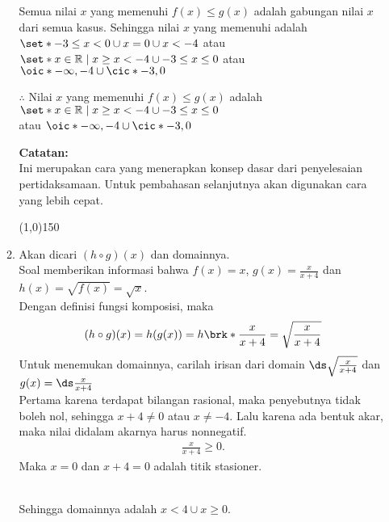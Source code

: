 \begin{enumerate}[leftmargin=*, label={\arabic*}.]
\begin{enumerate}[label={\alph*}.]
Semua nilai $x$ yang memenuhi $f(x) \leq g(x)$ adalah gabungan nilai $x$ 
dari semua kasus. Sehingga nilai $x$ yang memenuhi adalah 
$\set*{-3 \leq x < 0 \cup x = 0 \cup x < -4}$ atau 
$\set*{x \in \mathbb{R} \mid x \geq x < -4 \cup -3 \leq x \leq 0}$
atau $\oic*{-\infty, -4} \cup \cic*{-3,0}$
    
$\therefore$ Nilai $x$ yang memenuhi $f(x) \leq g(x)$ adalah
$\set*{x \in \mathbb{R} \mid x \geq x < -4 \cup -3 \leq x \leq 0}$\\
atau $\oic*{-\infty, -4} \cup \cic*{-3,0}$
    
\vspace{0.1cm}
\textbf{Catatan:}\\
Ini merupakan cara yang menerapkan konsep dasar dari penyelesaian
pertidaksamaan. Untuk pembahasan selanjutnya akan digunakan cara yang 
lebih cepat.
\begin{center}
    \line(1,0){150}
\end{center}
\item Akan dicari $(h \circ g)(x)$ dan domainnya.\\
Soal memberikan informasi bahwa $f(x) = x$, $g(x) = \frac{x}{x+4}$ 
dan $h(x) = \sqrt{f(x)} = \sqrt{x}$.\\
Dengan definisi fungsi komposisi, maka
\[
    (h \circ g)(x) = h(g(x)) = h\brk*{\frac{x}{x+4}} 
    = \sqrt{\frac{x}{x+4}}
\]
Untuk menemukan domainnya, carilah irisan dari domain  
$\ds \sqrt{\frac{x}{x+4}}$ dan $g(x)=\ds\frac{x}{x+4}$\\
Pertama karena terdapat bilangan rasional, maka penyebutnya tidak boleh
nol, sehingga $x+4 \neq 0$ atau $x\neq-4$. Lalu karena ada bentuk akar, 
maka nilai didalam akarnya harus nonnegatif.
\begin{align*}
    \frac{x}{x+4} \geq 0.
\end{align*}
Maka $x=0$ dan $x+4=0$ adalah titik stasioner.

\vspace{0.2cm}
\\
Sehingga domainnya adalah $x < 4 \cup x \geq 0$.


\end{enumerate}
\end{enumerate}
